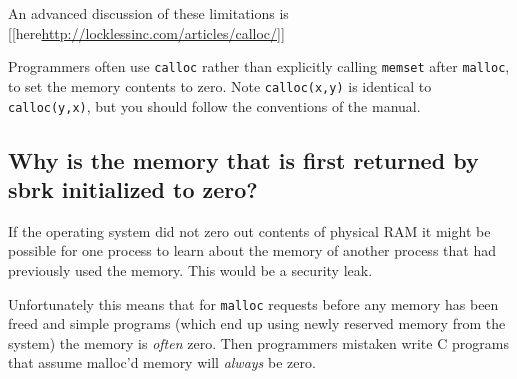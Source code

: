 An advanced discussion of these limitations is
{[}{[}here\textbar{}\url{http://locklessinc.com/articles/calloc/}{]}{]}

Programmers often use \texttt{calloc} rather than explicitly calling
\texttt{memset} after \texttt{malloc}, to set the memory contents to
zero. Note \texttt{calloc(x,y)} is identical to \texttt{calloc(y,x)},
but you should follow the conventions of the manual.

\begin{Shaded}
\begin{Highlighting}[]
\NormalTok{);}
\NormalTok{, }\NormalTok{); }

\NormalTok{, }\NormalTok{); }
\end{Highlighting}
\end{Shaded}

\subsection{Why is the memory that is first returned by sbrk initialized
to
zero?}\label{why-is-the-memory-that-is-first-returned-by-sbrk-initialized-to-zero}

If the operating system did not zero out contents of physical RAM it
might be possible for one process to learn about the memory of another
process that had previously used the memory. This would be a security
leak.

Unfortunately this means that for \texttt{malloc} requests before any
memory has been freed and simple programs (which end up using newly
reserved memory from the system) the memory is \emph{often} zero. Then
programmers mistaken write C programs that assume malloc'd memory will
\emph{always} be zero.

\begin{Shaded}
\begin{Highlighting}[]
\NormalTok{);}
 \NormalTok{); }
\end{Highlighting}
\end{Shaded}

